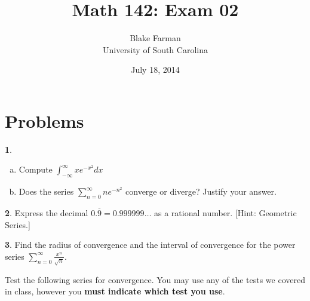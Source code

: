 \documentclass[12pt]{amsart}
\author{Blake Farman\\University of South Carolina}
\title{Math 142: Exam 02}
\date{July 18, 2014}
\begin{document}
\maketitle

\begin{center}
\end{center}

\vspace{0.2in}
\vspace{0.2in}

\theoremstyle{plain}
\newtheorem{lem}{Lemma}
\theoremstyle{definition}
\newtheorem{defn}{Definition}
\newtheorem{thm}{}
\newpage

\section{Problems}

\begin{thm}
  \begin{enumerate}[(a)]
  \item
    Compute $\displaystyle{\int_{-\infty}^{\infty} xe^{-x^2}}dx$
    \vspace{4in}
  \item
    Does the series $\displaystyle{\sum_{n=0}^{\infty} ne^{-n^2}}$ converge or diverge?  
    Justify your answer.
  \end{enumerate}
\end{thm}

\newpage

\begin{thm}
  Express the decimal $0.\overline{9} = 0.999999\ldots$ as a rational number. [Hint: Geometric Series.]
\end{thm}

\newpage

\begin{thm}
  Find the radius of convergence and the interval of convergence for the power series $\displaystyle{\sum_{n=0}^\infty \frac{x^n}{\sqrt{n}}}$.
\end{thm}

\newpage

Test the following series for convergence.
You may use any of the tests we covered in class, however you {\bf must indicate which test you use}.
\end{document}
